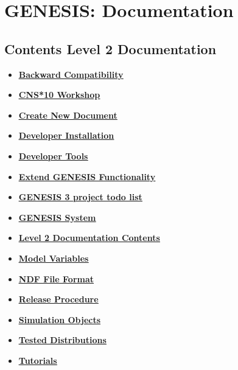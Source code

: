 \documentclass[12pt]{article}
\begin{document}
\section*{GENESIS: Documentation}

\subsection*{Contents Level 2 Documentation}

\begin{itemize}

\item \href{../backward-compatibility/backward-compatibility.pdf}{\bf \underline{Backward Compatibility}}

\item \href{../cns10-workshop/cns10-workshop.pdf}{\bf \underline{CNS*10 Workshop}}

\item \href{../create-document/create-document.pdf}{\bf \underline{Create New Document}}

\item \href{../developer-installation/developer-installation.pdf}{\bf \underline{Developer Installation}}

\item \href{../developer-tools/developer-tools.pdf}{\bf \underline{Developer Tools}}

\item \href{../genesis-extend-functionality/genesis-extend-functionality.pdf}{\bf \underline{Extend GENESIS Functionality}}

\item \href{../project-todo/project-todo.pdf}{\bf \underline{GENESIS 3 project todo list}}

\item \href{../genesis-system/genesis-system.pdf}{\bf \underline{GENESIS System}}

\item \href{../contents-level2/contents-level2.pdf}{\bf \underline{Level 2 Documentation Contents}}

\item \href{../model-variables/model-variables.pdf}{\bf \underline{Model Variables}}

\item \href{../ndf-file-format/ndf-file-format.pdf}{\bf \underline{NDF File Format}}

\item \href{../release-procedure/release-procedure.pdf}{\bf \underline{Release Procedure}}

\item \href{../simulation-objects/simulation-objects.pdf}{\bf \underline{Simulation Objects}}

\item \href{../tested-distributions/tested-distributions.pdf}{\bf \underline{Tested Distributions}}

\item \href{../tutorial-genesis/tutorial-genesis.pdf}{\bf \underline{Tutorials}}


\end{itemize}

\end{document}
